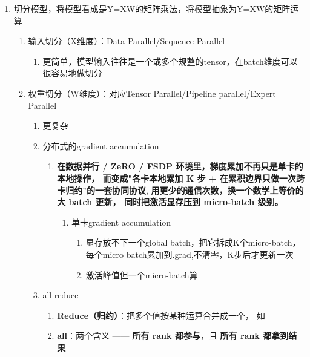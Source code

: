 \documentclass[UTF8,fontset=fandol]{ctexart}
\begin{document}
\begin{enumerate}
  \item 切分模型，将模型看成是Y=XW的矩阵乘法，将模型抽象为Y=XW的矩阵运算
  \begin{enumerate}
    \item 输入切分（X维度）：Data Parallel/Sequence Parallel
    \begin{enumerate}
      \item 更简单，模型输入往往是一个或多个规整的tensor，在batch维度可以很容易地做切分
    \end{enumerate}
    \item 权重切分（W维度）：对应Tensor Parallel/Pipeline parallel/Expert Parallel
    \begin{enumerate}
      \item 更复杂                                          %
      \item 分布式的gradient accumulation
      \begin{enumerate}
        \item \textbf{在数据并行 / ZeRO / FSDP 环境里，梯度累加不再只是单卡的本地操作，
          而变成"各卡本地累加 K 步 + 在累积边界只做一次跨卡归约"的一套协同协议},
          \textbf{用更少的通信次数，换一个数学上等价的大 batch 更新，
          同时把激活显存压到 micro-batch 级别。}
        \begin{enumerate}
          \item 单卡gradient accumulation
          \begin{enumerate}
            \item 显存放不下一个global batch，把它拆成K个micro-batch，
              每个micro batch累加到.grad,不清零，K步后才更新一次
            \item 激活峰值但一个micro-batch算
          \end{enumerate}
        \end{enumerate}
      \end{enumerate}
      \item all-reduce
      \begin{enumerate}
        \item \textbf{Reduce（归约）}：把多个值按某种运算合并成一个，
          如 
        \item \textbf{all}：两个含义 —— \textbf{所有 rank 都参与}，且
          \textbf{所有 rank 都拿到结果}
      \end{enumerate}
    \end{enumerate}
  \end{enumerate}


\end{enumerate}
\end{document}
